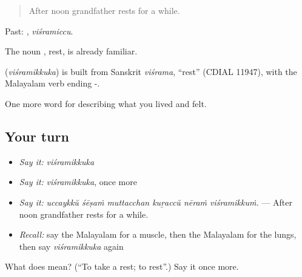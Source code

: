 \begin{quote}
After noon grandfather rests for a while.
\end{quote}

Past: , \emph{viśramiccu}.

The noun , rest, is already familiar.

\begin{cousinweb}
\textbf{} (\emph{viśramikkuka}) is built from Sanskrit \emph{viśrama}, \textquotedblleft{}rest\textquotedblright{} (CDIAL 11947), with the Malayalam verb ending -.
\end{cousinweb}

\begin{grammarlens}[title={What you've built}]
One more word for describing what you lived and felt.
\end{grammarlens}

\subsection*{Your turn}
\begin{itemize}
\raggedright
  \item \emph{Say it:} \emph{viśramikkuka}
  \item \emph{Say it:} \emph{viśramikkuka}, once more
  \item \emph{Say it:} \emph{uccaykkŭ śēṣaṁ muttacchan kuṟaccŭ nēraṁ viśramikkuṁ.} — After noon grandfather rests for a while.
  \item \emph{Recall:} say the Malayalam for a muscle, then the Malayalam for the lungs, then say \emph{viśramikkuka} again
\end{itemize}

\begin{tcolorbox}[breakable,colback=teal!4,colframe=teal!35!black,title={Before you move on}]
What does  mean? (\textquotedblleft{}To take a rest; to rest\textquotedblright{}.) Say it once more.
\end{tcolorbox}
